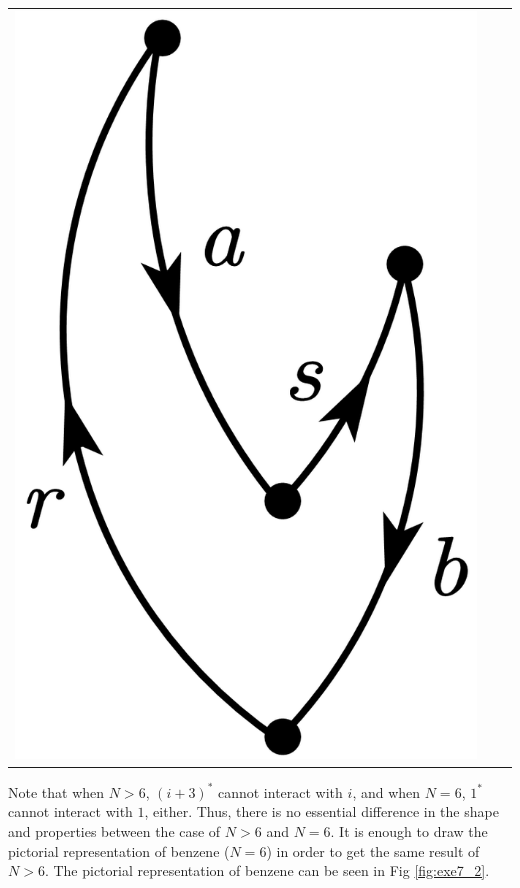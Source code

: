\documentclass[a4paper]{book}
\newcounter{solution}[chapter]
\newcommand\Figref[1]{Fig \ref{#1}}
\begin{document}
\begin{solution}
\begin{itemize}
\begin{center}
\begin{tabular}{ccc}
		\begin{minipage}{0.22\linewidth}
		\centering
		\includegraphics[scale=1.0,trim=0 -4 0 -4]{./pictures/6.07/diagram_6.png}
		\end{minipage}
		
	\end{tabular}
	\label{fig:exe7_1}
	\end{center}
	
	Note that when $N>6$, $(i+3)^*$ cannot interact with $i$, and when $N=6$, $1^*$ cannot interact with $1$, either. Thus, there is no essential difference in the shape and properties between the case of $N > 6$ and $N=6$. It is enough to draw the pictorial representation of benzene ($N=6$) in order to get the same result of $N>6$. The pictorial representation of benzene can be seen in \Figref{fig:exe7_2}.
	

\end{itemize}
\end{solution}
\end{document}
